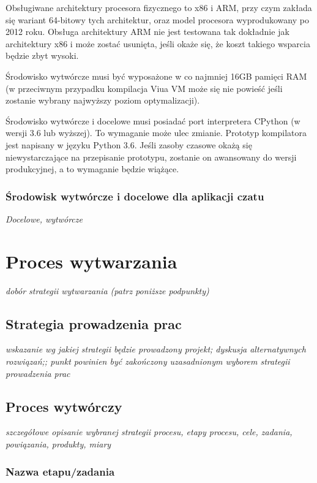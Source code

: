 \documentclass[11pt,oneside,a4paper,titlepage,onecolumn]{article}
\begin{document}
Obsługiwane architektury procesora fizycznego to x86 i ARM, przy czym zakłada się wariant 64-bitowy tych
architektur, oraz model procesora wyprodukowany po 2012 roku. Obsługa architektury ARM nie jest testowana tak
dokładnie jak architektury x86 i może zostać usunięta, jeśli okaże się, że koszt takiego wsparcia będzie zbyt
wysoki.

Środowisko wytwórcze musi być wyposażone w co najmniej 16GB pamięci RAM (w przeciwnym przypadku kompilacja
Viua VM może się nie powieść jeśli zostanie wybrany najwyższy poziom optymalizacji).

Środowisko wytwórcze i docelowe musi posiadać port interpretera CPython (w wersji 3.6 lub wyższej). To
wymaganie może ulec zmianie. Prototyp kompilatora jest napisany w języku Python 3.6. Jeśli zasoby czasowe
okażą się niewystarczające na przepisanie prototypu, zostanie on awansowany do wersji produkcyjnej, a to
wymaganie będzie wiążące.

\subsubsection{Środowisk wytwórcze i docelowe dla aplikacji czatu}

\emph{Docelowe, wytwórcze}

\section{Proces wytwarzania}

\emph{dobór strategii wytwarzania (patrz poniższe podpunkty)}

\subsection{Strategia prowadzenia prac}

\emph{wskazanie wg jakiej strategii będzie prowadzony projekt; dyskusja alternatywnych rozwiązań;; punkt powinien być zakończony uzasadnionym wyborem strategii prowadzenia prac}

\subsection{Proces wytwórczy}

\emph{szczegółowe opisanie wybranej strategii procesu, etapy procesu, cele, zadania, powiązania, produkty, miary}

\subsubsection{Nazwa etapu/zadania}
\end{document}
